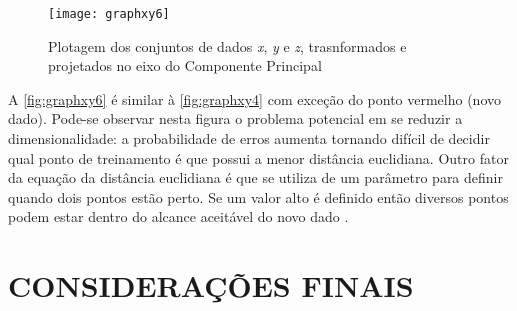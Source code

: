 \begin{figure}[h]
	\centering
	\texttt{[image: graphxy6]}
	\caption{Plotagem dos conjuntos de dados \textit{x}, \textit{y} e \textit{z}, trasnformados e projetados no eixo do Componente Principal}
	\label{fig:graphxy6}
\end{figure}

A \autoref{fig:graphxy6} é similar à \autoref{fig:graphxy4} com exceção do ponto vermelho (novo dado). Pode-se observar nesta figura o problema potencial em se reduzir a dimensionalidade: a probabilidade de erros aumenta tornando difícil de decidir qual ponto de treinamento é que possui a menor distância euclidiana. Outro fator da equação da distância euclidiana é que se utiliza de um parâmetro para definir quando dois pontos estão perto. Se um valor alto é definido então diversos pontos podem estar dentro do alcance aceitável do novo dado \cite{drmathew_java_programming}.



\section{CONSIDERAÇÕES FINAIS}\label{sec:revbib_consid_finais}























